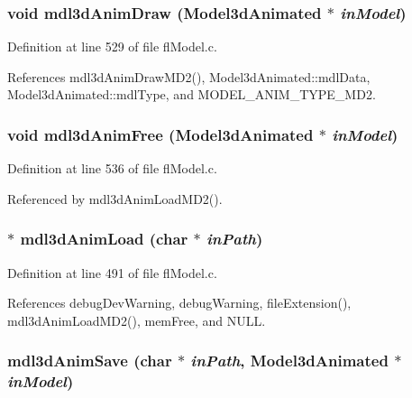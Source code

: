 \subsubsection{\setlength{\rightskip}{0pt plus 5cm}void mdl3d\-Anim\-Draw ({\bf Model3d\-Animated} $\ast$ {\em in\-Model})}\label{flModel_8c_fda07d8b0fa108ae3b3a53fb02179f9e}




Definition at line 529 of file fl\-Model.c.

References mdl3d\-Anim\-Draw\-MD2(), Model3d\-Animated::mdl\-Data, Model3d\-Animated::mdl\-Type, and MODEL\_\-ANIM\_\-TYPE\_\-MD2.
\subsubsection{\setlength{\rightskip}{0pt plus 5cm}void mdl3d\-Anim\-Free ({\bf Model3d\-Animated} $\ast$ {\em in\-Model})}\label{flModel_8c_505d5a999b50546385c81e59ed9a16c8}




Definition at line 536 of file fl\-Model.c.

Referenced by mdl3d\-Anim\-Load\-MD2().
\subsubsection{$\ast$ mdl3d\-Anim\-Load (char $\ast$ {\em in\-Path})}\label{flModel_8c_473ee9490cf7380372e04daf1289587f}




Definition at line 491 of file fl\-Model.c.

References debug\-Dev\-Warning, debug\-Warning, file\-Extension(), mdl3d\-Anim\-Load\-MD2(), mem\-Free, and NULL.
\subsubsection{ mdl3d\-Anim\-Save (char $\ast$ {\em in\-Path}, {\bf Model3d\-Animated} $\ast$ {\em in\-Model})}\label{flModel_8c_ea4bbb9d2e21e14e66b277b5a94f6285}




